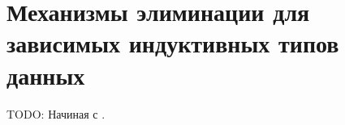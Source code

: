 \section{Механизмы элиминации для зависимых индуктивных типов данных}

TODO: Начиная с \cite{the-view-from-the-left}.
